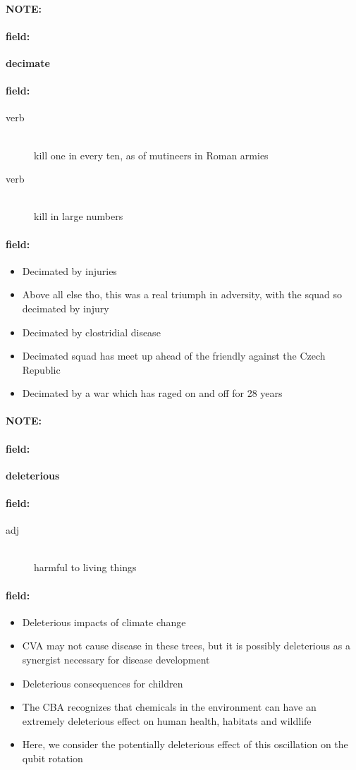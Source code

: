 \documentclass[12pt]{article}
\newenvironment{note}{\paragraph{NOTE:}}{}
\newenvironment{field}{\paragraph{field:}}{}
\begin{document}
\begin{note}
\begin{field}
\textbf{\large decimate}
\end{field}


\begin{field}
\begin{description}
\item[verb] \hfill \\ 
kill one in every ten, as of mutineers in Roman armies

\item[verb] \hfill \\ 
kill in large numbers

\end{description}
\end{field}

\begin{field}
\begin{itemize}
\item Decimated by injuries
\item Above all else tho, this was a real triumph in adversity, with the squad so decimated by injury
\item Decimated by clostridial disease
\item Decimated squad has meet up ahead of the friendly against the Czech Republic
\item Decimated by a war which has raged on and off for 28 years
\end{itemize}
\end{field}
\end{note}
\begin{note}
\begin{field}
\textbf{\large deleterious}
\end{field}


\begin{field}
\begin{description}
\item[adj] \hfill \\ 
harmful to living things

\end{description}
\end{field}

\begin{field}
\begin{itemize}
\item Deleterious impacts of climate change
\item CVA may not cause disease in these trees, but it is possibly deleterious as a synergist necessary for disease development
\item Deleterious consequences for children
\item The CBA recognizes that chemicals in the environment can have an extremely deleterious effect on human health, habitats and wildlife
\item Here, we consider the potentially deleterious effect of this oscillation on the qubit rotation
\end{itemize}
\end{field}
\end{note}
\end{document}
